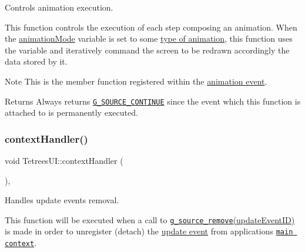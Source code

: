 Controls animation execution. 

This function controls the execution of each step composing an animation. When the \hyperlink{classTetreesUI_af3bd9b55da30d2b324c2dfe2d740d8a2}{animation\+Mode} variable is set to some \hyperlink{TetreesDefs_8hpp_a10487f3bfa31fd7b7b8c20f403f8c947}{type of animation}, this function uses the  variable and iteratively command the screen to be redrawn accordingly the data stored by it. \begin{DoxyNote}{Note}
This is the member function registered within the \hyperlink{TetreesDefs_8hpp_a607bc7bf79fa19b90a730745ca487a4b}{animation event}. 
\end{DoxyNote}
\begin{DoxyReturn}{Returns}
Always returns \href{https://developer.gnome.org/glib/stable/glib-The-Main-Event-Loop.html#G-SOURCE-CONTINUE:CAPS}{\tt G\+\_\+\+S\+O\+U\+R\+C\+E\+\_\+\+C\+O\+N\+T\+I\+N\+UE} since the event which this function is attached to is permanently executed. 
\end{DoxyReturn}
\mbox{\label{classTetreesUI_ae7d84906e943cd4b795800d4d561955c}} 
\subsubsection{\texorpdfstring{context\+Handler()}{contextHandler()}}
{\footnotesize\ttfamily void Tetrees\+U\+I\+::context\+Handler (\begin{DoxyParamCaption}{ }\end{DoxyParamCaption})\hspace{0.3cm}{\ttfamily [static]}, {\ttfamily [private]}}



Handles update event\textquotesingle{}s removal. 

This function will be executed when a call to \href{https://developer.gnome.org/glib/stable/glib-The-Main-Event-Loop.html#g-source-remove}{\tt g\+\_\+source\+\_\+remove}\hyperlink{TetreesUI_8cpp_a10408b8935c73e0f669f6268f22f1de3}{(update\+Event\+ID)} is made in order to unregister (detach) the \hyperlink{TetreesDefs_8hpp_aaf9e35ddd627efe32323b1ba02ee514e}{update event} from application\textquotesingle{}s \href{https://developer.gnome.org/programming-guidelines/stable/main-contexts.html.en}{\tt main context}.

